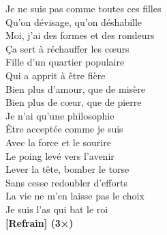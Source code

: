 \documentclass{novel}
\begin{document}
\begin{multicols}{2}
Je ne suis pas comme toutes ces filles \\
Qu'on dévisage, qu'on déshabille \\
Moi, j'ai des formes et des rondeurs \\
Ça sert à réchauffer les cœurs \\
Fille d'un quartier populaire \\
Qui a apprit à être fière \\
Bien plus d'amour, que de misère \\
Bien plus de cœur, que de pierre \\

Je n'ai qu'une philosophie \\
Être acceptée comme je suis \\
Avec la force et le sourire \\
Le poing levé vers l'avenir \\
Lever la tête, bomber le torse \\
Sans cesse redoubler d'efforts \\
La vie ne m'en laisse pas le choix \\
Je suis l'as qui bat le roi \\

\textbf{[Refrain] (3×)}\\

\end{multicols}
\end{document}
